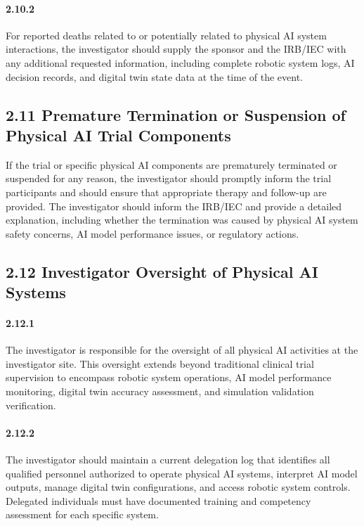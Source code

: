 \documentclass[11pt]{article}
\begin{document}
\paragraph{2.10.2} For reported deaths related to or potentially related to physical AI system interactions, the investigator should supply the sponsor and the IRB/IEC with any additional requested information, including complete robotic system logs, AI decision records, and digital twin state data at the time of the event.

\subsection{2.11 Premature Termination or Suspension of Physical AI Trial Components}

If the trial or specific physical AI components are prematurely terminated or suspended for any reason, the investigator should promptly inform the trial participants and should ensure that appropriate therapy and follow-up are provided. The investigator should inform the IRB/IEC and provide a detailed explanation, including whether the termination was caused by physical AI system safety concerns, AI model performance issues, or regulatory actions.

\subsection{2.12 Investigator Oversight of Physical AI Systems}

\paragraph{2.12.1} The investigator is responsible for the oversight of all physical AI activities at the investigator site. This oversight extends beyond traditional clinical trial supervision to encompass robotic system operations, AI model performance monitoring, digital twin accuracy assessment, and simulation validation verification.

\paragraph{2.12.2} The investigator should maintain a current delegation log that identifies all qualified personnel authorized to operate physical AI systems, interpret AI model outputs, manage digital twin configurations, and access robotic system controls. Delegated individuals must have documented training and competency assessment for each specific system.
\end{document}
